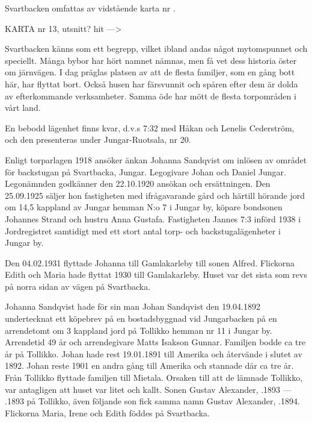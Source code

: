
Svartbacken omfattas av vidstående karta nr .


KARTA nr 13, utsnitt? hit --->





Svartbacken känns som ett begrepp, vilket ibland andas något mytomspunnet och speciellt. Många bybor har hört namnet nämnas, men få vet dess historia öster om järnvägen. I dag präglas platsen av att de flesta familjer, som en gång bott här, har flyttat bort. Också husen har färsvunnit och spåren efter dem är dolda av efterkommande verksamheter. Samma öde har mött de flesta torpområden i vårt land.

En bebodd lägenhet finns kvar, d.v.s  7:32 med Håkan och Lenelis Cederström, och den presenteras under Jungar-Ruotsala, nr 20.





Enligt torparlagen 1918 ansöker änkan Johanna Sandqvist om inlösen av området för backstugan på Svartbacka, Jungar. Legogivare Johan och Daniel Jungar. Legonämnden godkänner den 22.10.1920 ansökan och ersättningen. Den 25.09.1925 säljer hon fastigheten med ifrågavarande gård och härtill hörande jord om 14,5 kappland av Jungar hemman N:o 7 i Jungar by, köpare  bondsonen Johannes Strand och hustru Anna Gustafa. Fastigheten Jannes 7:3 införd 1938 i Jordregistret samtidigt med ett stort antal torp- och backstugalägenheter i Jungar by.

Den 04.02.1931 flyttade Johanna till Gamlakarleby till sonen Alfred. Flickorna Edith och Maria hade flyttat 1930 till Gamlakarleby. Huset var det sista som revs på norra sidan av vägen på Svartbacka.

Johanna Sandqvist hade för sin man Johan Sandqvist den 19.04.1892	undertecknat ett köpebrev på en bostadsbyggnad vid Jungarbacken på en arrendetomt om 3 kappland jord på Tollikko	hemman nr 11 i Jungar by. Arrendetid 49 år och arrendegivare Matts	Isakson Gunnar. Familjen bodde ca tre år på Tollikko. Johan hade rest	19.01.1891 till Amerika och återvände i slutet av 1892. Johan reste 1901 en andra gång till Amerika och stannade där ca tre år. Från Tollikko flyttade familjen till Mietala. Orsaken till att de lämnade Tollikko, var antagligen att huset var litet och kallt. Sonen Gustav Alexander, .1893  ---  .1893 på Tollikko, även följande son fick samma namn Gustav Alexander, .1894. Flickorna Maria, Irene och 	Edith föddes på Svartbacka.

